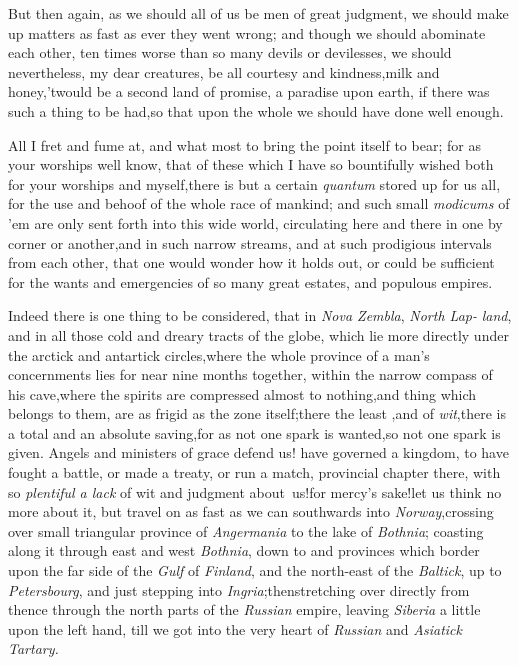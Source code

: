 \documentclass{article}
\begin{document}
But then again, as we should all of us be men of great judgment,
we should make up matters as fast as ever they went wrong; and
though we should abominate each other, ten times worse than so many
devils or devilesses, we should nevertheless, my dear creatures, be
all courtesy and kindness,\tsh milk and honey,\tsh ’twould be a
second land of promise,\tsh\break
a paradise upon earth, if there was
such a thing to be had,\tsk so that upon the whole we should have
done well enough.

All I fret and fume at, and what most 
to bring the point itself to bear; for as your
worships well know, that of these 
which I have so bountifully wished both for your
worships and myself,\tsk there is but a certain \textit{quantum}
stored up for us all, for the use and behoof of the whole race of
mankind; and such small \textit{modicums} of ’em are only sent forth
into this wide world, circulating here and there in one by corner
or another,\tsk and in such narrow streams, and at such prodigious
intervals from each other, that one would wonder how it holds out,
or could be sufficient for the wants and emergencies of so many
great estates, and populous empires.

Indeed there is one thing to be considered, that in \textit{Nova
Zembla}, \textit{North Lap-}\break
\textit{land}, and in all those cold and dreary tracts
of the globe, which lie more directly under the arctick and
antartick circles,\tsh where the whole province of a man’s
concernments lies for near nine months together, within the narrow
compass of his cave,\tsk where the spirits are compressed almost
to nothing,\tsk and 
thing which belongs to them, are as frigid as the zone
itself;\tsk there the least ,\tsh and of \textit{wit},\tsh there
is a total and an absolute saving,\tsk for as not one spark
is wanted,\tsk so not one spark is given. Angels and ministers of
grace defend us!\break
{}
have governed a kingdom, to have fought a battle, or made a treaty, or
run a match,  provincial
chapter there, with so \textit{plenti\-ful a lack} of wit and judgment
about~us!\@ for mercy’s sake!\@ let us think no more about it,
but travel on as fast as we can southwards into
\textit{Norway},\tsk crossing over
small triangular province of \textit{Angermania} to the
lake of \textit{Bothnia}; coasting along it through east and west
\textit{Bothnia}, down to\break 
{}
and provinces which border upon the far side of the
\textit{Gulf} of \textit{Finland}, and the north-east of the
\textit{Baltick}, up to \textit{Petersbourg}, and just stepping into
\textit{Ingria};\tsh then\break stretching over directly from
thence
through the north parts of the \textit{Russian} empire,\tsk
leaving \textit{Siberia} a little upon the left hand, till we
got into the very heart of \textit{Russian} and \textit{Asiatick
Tartary.}
\end{document}
